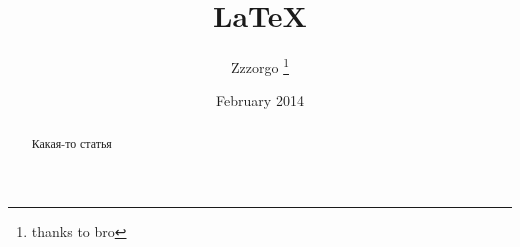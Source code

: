 \documentclass[9pt, letterpaper, twocolumn]{article}
\title{\LaTeX}
\date{February 2014}
\author{Zzzorgo \thanks{thanks to bro}}
\begin{document}
\begin{titlepage}
    \maketitle
    \begin{abstract}
        Какая-то статья
    \end{abstract}
    \listoffigures
    \tableofcontents
\end{titlepage}



\twocolumnbagebreak



\end{document}
